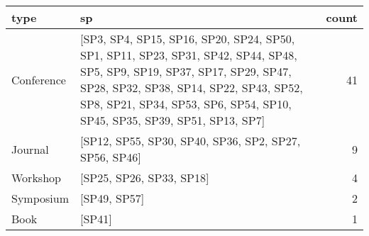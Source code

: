 \begin{tabular}{llr}
\toprule
       type &                                                                                                                                                                                                                                              sp &  count \\
\midrule
 Conference &  [SP3, SP4, SP15, SP16, SP20, SP24, SP50, SP1, SP11, SP23, SP31, SP42, SP44, SP48, SP5, SP9, SP19, SP37, SP17, SP29, SP47, SP28, SP32, SP38, SP14, SP22, SP43, SP52, SP8, SP21, SP34, SP53, SP6, SP54, SP10, SP45, SP35, SP39, SP51, SP13, SP7] &     41 \\
    Journal &                                                                                                                                                                                           [SP12, SP55, SP30, SP40, SP36, SP2, SP27, SP56, SP46] &      9 \\
   Workshop &                                                                                                                                                                                                                        [SP25, SP26, SP33, SP18] &      4 \\
  Symposium &                                                                                                                                                                                                                                    [SP49, SP57] &      2 \\
       Book &                                                                                                                                                                                                                                          [SP41] &      1 \\
\bottomrule
\end{tabular}
